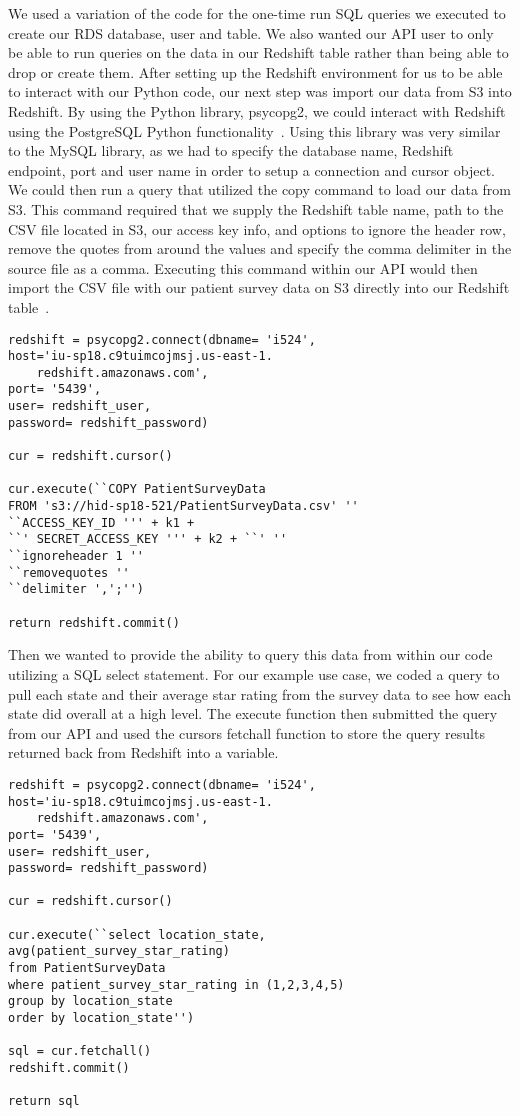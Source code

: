 We used a variation of the code for the one-time run SQL queries we executed 
to create our RDS database, user and table. We also wanted our API user to 
only be able to run queries on the data in our Redshift table rather than 
being able to drop or create them. After setting up the Redshift environment 
for us to be able to interact with our Python code, our next step was import 
our data from S3 into Redshift. By using the Python library, psycopg2, we 
could interact with Redshift using the PostgreSQL Python 
functionality~\cite{hid-sp18-521-redshift-postgreSQL}. Using this library was 
very similar to the MySQL library, as we had to specify the database name, 
Redshift endpoint, port and user name in order to setup a connection and 
cursor object. We could then run a query that utilized the copy command to 
load our data from S3. This command required that we supply the Redshift table 
name, path to the CSV file located in S3, our access key info, and options to 
ignore the header row, remove the quotes from around the values and specify 
the comma delimiter in the source file as a comma. Executing this command 
within our API would then import the CSV file with our patient survey data on 
S3 directly into our Redshift 
table~\cite{hid-sp18-521-redshift-gettingstarted}.  

\begin{verbatim}
redshift = psycopg2.connect(dbname= 'i524', 
host='iu-sp18.c9tuimcojmsj.us-east-1.
	redshift.amazonaws.com',
port= '5439', 
user= redshift_user, 
password= redshift_password)

cur = redshift.cursor()

cur.execute(``COPY PatientSurveyData 
FROM 's3://hid-sp18-521/PatientSurveyData.csv' ''
``ACCESS_KEY_ID ''' + k1 + 
``' SECRET_ACCESS_KEY ''' + k2 + ``' ''
``ignoreheader 1 ''
``removequotes ''
``delimiter ',';'')

return redshift.commit()
\end{verbatim}	

Then we wanted to provide the ability to query this data from within our code 
utilizing a SQL select statement. For our example use case, we coded a query 
to pull each state and their average star rating from the survey data to see 
how each state did overall at a high level. The execute function then 
submitted the query from our API and used the cursors fetchall function to 
store the query results returned back from Redshift into a variable. 

\begin{verbatim}
redshift = psycopg2.connect(dbname= 'i524', 
host='iu-sp18.c9tuimcojmsj.us-east-1.
	redshift.amazonaws.com',
port= '5439', 
user= redshift_user, 
password= redshift_password)

cur = redshift.cursor()

cur.execute(``select location_state, 
avg(patient_survey_star_rating) 
from PatientSurveyData
where patient_survey_star_rating in (1,2,3,4,5) 
group by location_state 
order by location_state'')

sql = cur.fetchall()
redshift.commit()

return sql
\end{verbatim}	

